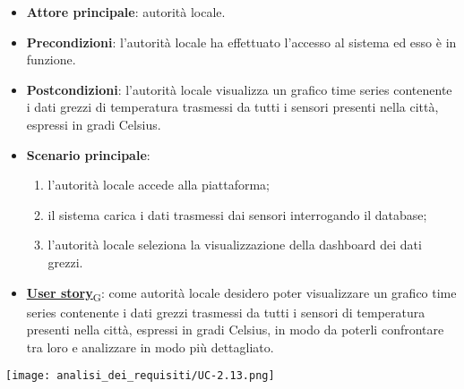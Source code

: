 \begin{itemize}
	\item \textbf{Attore principale}: autorità locale.
	\item \textbf{Precondizioni}: l'autorità locale ha effettuato l'accesso al sistema ed esso è in funzione.
	\item \textbf{Postcondizioni}: l'autorità locale visualizza un grafico time series contenente i dati grezzi di temperatura trasmessi da tutti i sensori
	      presenti nella città, espressi in gradi Celsius.
	\item \textbf{Scenario principale}:
	      \begin{enumerate}
		      \item l'autorità locale accede alla piattaforma;
		      \item il sistema carica i dati trasmessi dai sensori interrogando il database;
		      \item l'autorità locale seleziona la visualizzazione della dashboard dei dati grezzi.
	      \end{enumerate}
	\item \href{https://7last.github.io/docs/rtb/documentazione-interna/glossario\#user-story}{\textbf{User story}\textsubscript{G}}:
	      come autorità locale desidero poter visualizzare un grafico time series contenente i dati grezzi trasmessi da tutti i sensori
	      di temperatura presenti nella città, espressi in gradi Celsius, in modo da poterli confrontare tra loro e analizzare in modo più dettagliato.
\end{itemize}
\begin{center}
	\texttt{[image: analisi\_dei\_requisiti/UC-2.13.png]}
\end{center}


